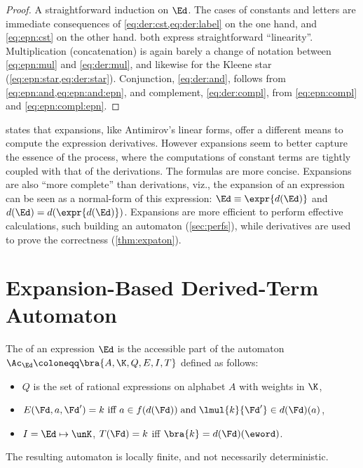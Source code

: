\documentclass[a4paper,USenglish]{lipics}
\begin{document}
\begin{proof}
  A straightforward induction on $\Ed$.  The cases of constants and letters
  are immediate consequences of \cref{eq:der:cst,eq:der:label} on the one
  hand, and \cref{eq:epn:cst} on the other hand.
   both express straightforward ``linearity''.
  Multiplication (concatenation) is again barely a change of notation
  between \cref{eq:epn:mul} and \cref{eq:der:mul}, and likewise for the
  Kleene star (\cref{eq:epn:star,eq:der:star}).  Conjunction,
  \cref{eq:der:and}, follows from \cref{eq:epn:and,eq:epn:and:epn}, and
  complement, \cref{eq:der:compl}, from \cref{eq:epn:compl} and
  \cref{eq:epn:compl:epn}.
\end{proof}

 states that expansions, like Antimirov's linear forms,
offer a different means to compute the expression derivatives.  However
expansions seem to better capture the essence of the process, where the
computations of constant terms are tightly coupled with that of the
derivations.  The formulas are more concise.  Expansions are also ``more
complete'' than derivations, viz., the expansion of an expression can be
seen as a normal-form of this expression: $\Ed \equiv \expr{d(\Ed)}$ and
$d(\Ed)=d(\expr{d(\Ed)})$.  Expansions are more efficient to perform
effective calculations, such building an automaton (\cref{sec:perfs}), while
derivatives are used to prove the correctness (\cref{thm:expaton}).

\section{Expansion-Based Derived-Term Automaton}
\label{sec:expaton}
\vspace{-1ex}
\begin{Definition}
  \label{def:expaton}
  The  of an expression $\Ed$ is the accessible
  part of the automaton ${\Ac_\Ed} \coloneqq \bra{A, \K, Q, E, I, T}$
  defined as follows:
  \begin{itemize}
  \item $Q$ is the set of rational expressions on alphabet $A$ with weights
    in $\K$,
  \item
    $E(\Fd, a, \Fd') = k \text{ iff } a \in f(d(\Fd)) \;\mathrm{and}\;
    \lmul{k}{\Fd'} \in d(\Fd)(a)$,
  \item $I = \Ed \mapsto \unK$, $T(\Fd) = k$ iff $\bra{k} = d(\Fd)(\eword)$.
  \end{itemize}
\end{Definition}
The resulting automaton is locally finite, and not necessarily
deterministic.
\end{document}

